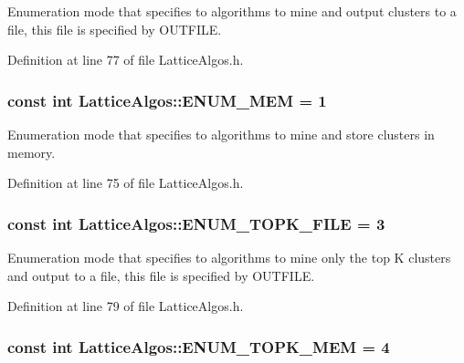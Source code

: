 Enumeration mode that specifies to algorithms to mine and output clusters to a file, this file is specified by OUTFILE. 



Definition at line 77 of file LatticeAlgos.h.

\hypertarget{class_lattice_algos_a80df6360d3246d74ae31e51e6c4bfa0e}{
\subsubsection[{ENUM\_\-MEM}]{\setlength{\rightskip}{0pt plus 5cm}const int {\bf LatticeAlgos::ENUM\_\-MEM} = 1}}
\label{class_lattice_algos_a80df6360d3246d74ae31e51e6c4bfa0e}


Enumeration mode that specifies to algorithms to mine and store clusters in memory. 



Definition at line 75 of file LatticeAlgos.h.

\hypertarget{class_lattice_algos_a04a0ea3a71c5b598242fa4ec3d4fce79}{
\subsubsection[{ENUM\_\-TOPK\_\-FILE}]{\setlength{\rightskip}{0pt plus 5cm}const int {\bf LatticeAlgos::ENUM\_\-TOPK\_\-FILE} = 3}}
\label{class_lattice_algos_a04a0ea3a71c5b598242fa4ec3d4fce79}


Enumeration mode that specifies to algorithms to mine only the top K clusters and output to a file, this file is specified by OUTFILE. 



Definition at line 79 of file LatticeAlgos.h.

\hypertarget{class_lattice_algos_a1c6a4b5dce3ccade9e17ce4b2a6afbe7}{
\subsubsection[{ENUM\_\-TOPK\_\-MEM}]{\setlength{\rightskip}{0pt plus 5cm}const int {\bf LatticeAlgos::ENUM\_\-TOPK\_\-MEM} = 4}}
\label{class_lattice_algos_a1c6a4b5dce3ccade9e17ce4b2a6afbe7}


